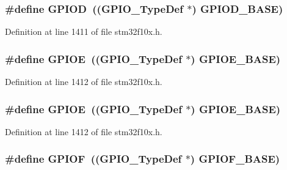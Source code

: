 \subsubsection[{\texorpdfstring{G\+P\+I\+OD}{GPIOD}}]{\setlength{\rightskip}{0pt plus 5cm}\#define G\+P\+I\+OD~(({\bf G\+P\+I\+O\+\_\+\+Type\+Def} $\ast$) {\bf G\+P\+I\+O\+D\+\_\+\+B\+A\+SE})}\hypertarget{group___peripheral__declaration_ga7580b1a929ea9df59725ba9c18eba6ac}{}\label{group___peripheral__declaration_ga7580b1a929ea9df59725ba9c18eba6ac}


Definition at line 1411 of file stm32f10x.\+h.

\subsubsection[{\texorpdfstring{G\+P\+I\+OE}{GPIOE}}]{\setlength{\rightskip}{0pt plus 5cm}\#define G\+P\+I\+OE~(({\bf G\+P\+I\+O\+\_\+\+Type\+Def} $\ast$) {\bf G\+P\+I\+O\+E\+\_\+\+B\+A\+SE})}\hypertarget{group___peripheral__declaration_gae04bdb5e8acc47cab1d0532e6b0d0763}{}\label{group___peripheral__declaration_gae04bdb5e8acc47cab1d0532e6b0d0763}


Definition at line 1412 of file stm32f10x.\+h.

\subsubsection[{\texorpdfstring{G\+P\+I\+OE}{GPIOE}}]{\setlength{\rightskip}{0pt plus 5cm}\#define G\+P\+I\+OE~(({\bf G\+P\+I\+O\+\_\+\+Type\+Def} $\ast$) {\bf G\+P\+I\+O\+E\+\_\+\+B\+A\+SE})}\hypertarget{group___peripheral__declaration_gae04bdb5e8acc47cab1d0532e6b0d0763}{}\label{group___peripheral__declaration_gae04bdb5e8acc47cab1d0532e6b0d0763}


Definition at line 1412 of file stm32f10x.\+h.

\subsubsection[{\texorpdfstring{G\+P\+I\+OF}{GPIOF}}]{\setlength{\rightskip}{0pt plus 5cm}\#define G\+P\+I\+OF~(({\bf G\+P\+I\+O\+\_\+\+Type\+Def} $\ast$) {\bf G\+P\+I\+O\+F\+\_\+\+B\+A\+SE})}\hypertarget{group___peripheral__declaration_ga43c3022dede7c9db7a58d3c3409dbc8d}{}\label{group___peripheral__declaration_ga43c3022dede7c9db7a58d3c3409dbc8d}


